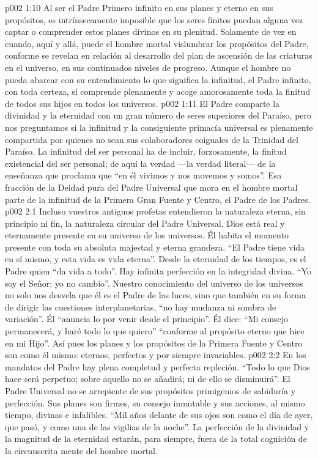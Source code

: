 \vs p002 1:10 \pc Al ser el Padre Primero infinito en sus planes y eterno en sus propósitos, es intrínsecamente imposible que los seres finitos puedan alguna vez captar o comprender estos planes divinos en su plenitud. Solamente de vez en cuando, aquí y allá, puede el hombre mortal vislumbrar los propósitos del Padre, conforme se revelan en relación al desarrollo del plan de ascensión de las criaturas en el universo, en sus continuados niveles de progreso. Aunque el hombre no pueda abarcar con su entendimiento lo que significa la infinitud, el Padre infinito, con toda certeza, sí comprende plenamente y acoge amorosamente toda la finitud de todos sus hijos en todos los universos.
\vs p002 1:11 El Padre comparte la divinidad y la eternidad con un gran número de seres superiores del Paraíso, pero nos preguntamos si la infinitud y la consiguiente primacía universal es plenamente compartida por quienes no sean sus colaboradores coiguales de la Trinidad del Paraíso. La infinitud del ser personal ha de incluir, forzosamente, la finitud existencial del ser personal; de aquí la verdad ---la verdad literal--- de la enseñanza que proclama que “en él vivimos y nos movemos y somos”. Esa fracción de la Deidad pura del Padre Universal que mora en el hombre mortal  parte de la infinitud de la Primera Gran Fuente y Centro, el Padre de los Padres.
\vs p002 2:1 Incluso vuestros antiguos profetas entendieron la naturaleza eterna, sin principio ni fin, la naturaleza circular del Padre Universal. Dios está real y eternamente presente en su universo de los universos. Él habita el momento presente con toda su absoluta majestad y eterna grandeza. “El Padre tiene vida en sí mismo, y esta vida es vida eterna”. Desde la eternidad de los tiempos, es el Padre quien “da vida a todo”. Hay infinita perfección en la integridad divina. “Yo soy el Señor; yo no cambio”. Nuestro conocimiento del universo de los universos no solo nos desvela que él es el Padre de las luces, sino que también en su forma de dirigir las cuestiones interplanetarias, “no hay mudanza ni sombra de variación”. Él “anuncia lo por venir desde el principio”. Él dice: “Mi consejo permanecerá, y haré todo lo que quiero” “conforme al propósito eterno que hice en mi Hijo”. Así pues los planes y los propósitos de la Primera Fuente y Centro son como él mismo: eternos, perfectos y por siempre invariables.
\vs p002 2:2 En los mandatos del Padre hay plena completud y perfecta repleción. “Todo lo que Dios hace será perpetuo; sobre aquello no se añadirá; ni de ello se disminuirá”. El Padre Universal no se arrepiente de sus propósitos primigenios de sabiduría y perfección. Sus planes son firmes, su consejo inmutable y sus acciones, al mismo tiempo, divinas e infalibles. “Mil años delante de sus ojos son como el día de ayer, que pasó, y como una de las vigilias de la noche”. La perfección de la divinidad y la magnitud de la eternidad estarán, para siempre, fuera de la total cognición de la circunscrita mente del hombre mortal.
